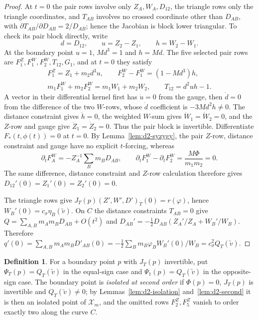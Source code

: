 \documentclass[Threeside,11pt]{article}
\theoremstyle{definition}
\newtheorem{definition}[theorem]{Definition}
\theoremstyle{remark}
\numberwithin{equation}{section}
\theoremstyle{remark}
\begin{document}
\begin{proof}
{At $t=0$ the pair rows involve only $Z_A,W_A,D_{12}$, the triangle rows only the triangle
coordinates, and $T_{AB}$ involves no crossed coordinate other than $D_{AB}$, with
$\partial T_{AB}/\partial D_{AB}=2/D_{AB}$; hence the Jacobian is block lower triangular.
To check its pair block directly, write
\[
 d=D_{12},\qquad u=Z_2-Z_1,\qquad h=W_2-W_1.
\]
At the boundary point $u=1$, $Md^3=1$ and $h=Md$. The five selected pair rows are
$F^Z_1,F^W_1,F^W_2,T_{12},G_1$, and at $t=0$ they satisfy
\[
\begin{gathered}
 F^Z_1=Z_1+m_2d^3u,\qquad F^W_2-F^W_1=(1-Md^3)h,\\
 m_1F^W_1+m_2F^W_2=m_1W_1+m_2W_2,\qquad T_{12}=d^2uh-1.
\end{gathered}
\]
A vector in their differential kernel first has $\dot u=0$ from the gauge, then
$\dot d=0$ from the difference of the two $W$-rows, whose $\dot d$ coefficient is
$-3Md^2h\ne0$. The distance constraint gives $\dot h=0$, the weighted $W$-sum gives
$\dot W_1=\dot W_2=0$, and the $Z$-row and gauge give
$\dot Z_1=\dot Z_2=0$. Thus the pair block is invertible.
Differentiate $F_*(t,\phi(t))=0$ at $t=0$.
By Lemma~\ref{lem:d2-syzygy}, the pair $Z$-row, distance constraint and gauge have no explicit
$t$-forcing, whereas
\[
 \partial_tF^W_A=-Z_A^{-1}\sum_Bm_BD_{AB},\qquad
 \partial_tF^W_1-\partial_tF^W_2=\frac{M\Phi}{m_1m_2}=0.
\]
The same difference, distance constraint and $Z$-row calculation therefore gives
$D_{12}'(0)=Z_1'(0)=Z_2'(0)=0$.

}The triangle rows give
$J_T(p)(Z',W',D')_T(0)=r(\varphi)$, hence $W_B'(0)=c_\sigma\eta_B(\tilde v)$.  On $C$ the distance constraints
$T_{AB}=0$ give $Q=\sum_{A,B}m_Am_BD_{AB}+O(t^2)$ and
$D_{AB}'=-\frac12D_{AB}(Z_A'/Z_A+W_B'/W_B)$.  Therefore
$q'(0)=\sum_{A,B}m_Am_BD'_{AB}(0)=-\frac12\sum_Bm_B\varphi_BW_B'(0)/W_B=c_\sigma^2Q_T(\tilde v)$.
\end{proof}

\begin{definition}\label{def:d2-psi}
For a boundary point $p$ with $J_T(p)$ invertible, put $\Psi_T(p)=Q_T(\tilde v)$ in the equal-sign case and
$\Psi_1(p)=Q_T(\tilde v)$ in the opposite-sign case.  The boundary point is \emph{isolated at second order}
if $\Phi(p)=0$, $J_T(p)$ is invertible and $Q_T(\tilde v)\ne0$; by
Lemmas~\ref{lem:d2-isolation} and~\ref{lem:d2-second} it is then an isolated point of $\mathcal X_m$, and
the omitted rows $F^Z_2,F^Z_5$ vanish to order exactly two along the curve $C$.
\end{definition}
\end{document}

